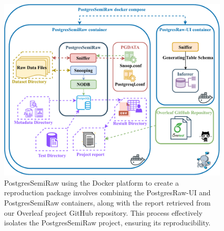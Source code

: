 \begin{figure}[h!]
\centering
\includegraphics[width=1.0\linewidth]{img/pgSemiRaw-repro.pdf}
\caption[PostgresSemira reproduction package.]{PostgresSemiRaw using the Docker platform to create a reproduction package involves combining the PostgresRaw-UI and PostgresSemiRaw containers, along with the report retrieved from our Overleaf project GitHub repository. This process effectively isolates the PostgresSemiRaw project, ensuring its reproducibility.}
\label{fig:pgSemiraw-repro}
\end{figure}